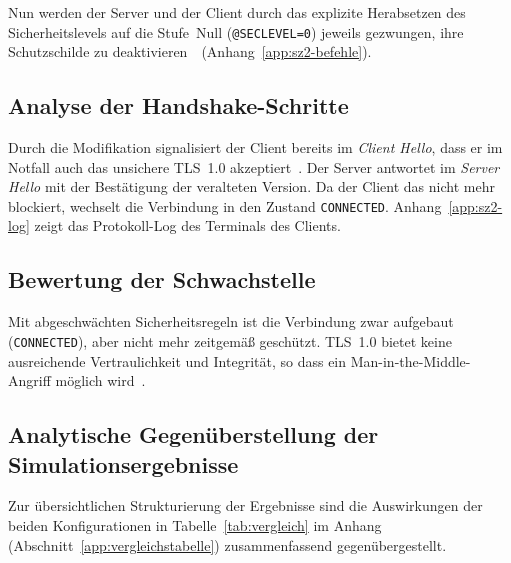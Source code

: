 Nun werden der Server und der Client durch das explizite Herabsetzen des
Sicherheitslevels auf die Stufe~Null (\texttt{@SECLEVEL=0}) jeweils gezwungen, ihre
Schutzschilde zu deaktivieren~\cite{openssl}~(Anhang~\ref{app:sz2-befehle}).

\subsection*{Analyse der Handshake-Schritte}

Durch die Modifikation signalisiert der Client bereits im \textit{Client Hello}, dass er
 im Notfall auch das unsichere TLS~1.0 akzeptiert~\cite{rfc8446}. Der Server antwortet
im \textit{Server Hello} mit der Bestätigung der veralteten Version. Da der Client das
nicht mehr blockiert, wechselt die Verbindung in den Zustand \texttt{CONNECTED}.
Anhang~\ref{app:sz2-log} zeigt das Protokoll-Log des Terminals des Clients.

\subsection*{Bewertung der Schwachstelle}

Mit abgeschwächten Sicherheitsregeln ist die Verbindung zwar aufgebaut (\texttt{CONNECTED}), aber nicht mehr
zeitgemäß geschützt. TLS~1.0 bietet keine ausreichende Vertraulichkeit und Integrität,
so dass ein Man-in-the-Middle-Angriff möglich wird~\cite{sentinelone,mdndocs}.

\subsection{Analytische Gegenüberstellung der Simulationsergebnisse}

Zur übersichtlichen Strukturierung der Ergebnisse sind die Auswirkungen der beiden Konfigurationen in Tabelle~\ref{tab:vergleich} im Anhang (Abschnitt~\ref{app:vergleichstabelle}) zusammenfassend gegenübergestellt.
